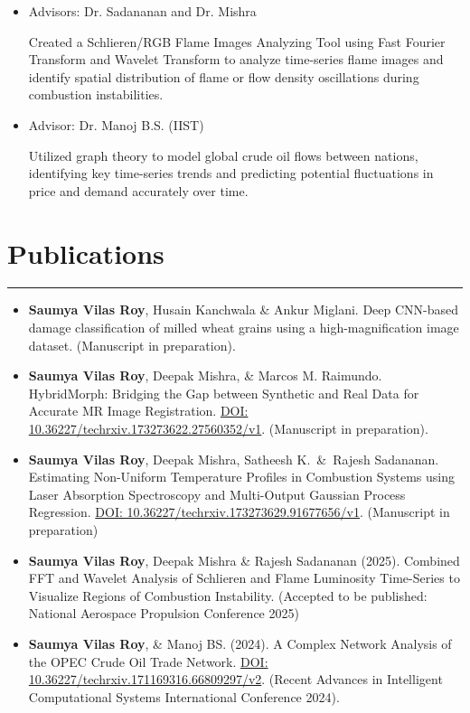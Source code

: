 \documentclass[11pt]{article}
\newlength{\sectionvspace}
\begin{document}
\begin{itemize}[leftmargin=*,noitemsep,topsep=0pt]
\begin{itemize}[leftmargin=*,noitemsep,topsep=0pt]
		
		\item Advisors: Dr. Sadananan and Dr. Mishra
		
Created a Schlieren/RGB Flame Images Analyzing Tool using Fast Fourier Transform and Wavelet Transform to analyze time-series flame images and identify spatial distribution of flame or flow density oscillations during combustion instabilities.
		\item Advisor: Dr. Manoj B.S. (IIST) 
		
Utilized graph theory to model global crude oil flows between nations, identifying key time-series trends and predicting potential fluctuations in price and demand accurately over time.
		
	\end{itemize}
					\end{itemize}
	
		\section*{\bf Publications}
	\vspace{\sectionvspace}
	\rule{\textwidth}{0.4pt}
	\begin{itemize}[leftmargin=*,noitemsep,topsep=0pt]
		
		
		\item \textbf{Saumya Vilas Roy}, Husain Kanchwala \& Ankur Miglani. Deep CNN-based damage classification of milled wheat grains using a high-magnification image dataset. (Manuscript in preparation).

		
\item \textbf{Saumya Vilas Roy}, Deepak Mishra, \& Marcos M. Raimundo. HybridMorph: Bridging the Gap between Synthetic and Real Data for Accurate MR Image Registration. \href{https://doi.org/10.36227/techrxiv.173273622.27560352/v1}{DOI: 10.36227/techrxiv.173273622.27560352/v1}. (Manuscript in preparation).
		
		\item \textbf{Saumya Vilas Roy}, Deepak Mishra, Satheesh K.~\&~Rajesh Sadananan. Estimating Non-Uniform Temperature Profiles in Combustion Systems using Laser Absorption Spectroscopy and Multi-Output Gaussian Process Regression. \href{https://doi.org/10.36227/techrxiv.173273629.91677656/v1}{DOI: 10.36227/techrxiv.173273629.91677656/v1}. (Manuscript in preparation)
		
		\item \textbf{Saumya Vilas Roy}, Deepak Mishra \& Rajesh Sadananan (2025). Combined FFT and Wavelet Analysis of Schlieren and Flame Luminosity Time-Series to Visualize Regions of Combustion Instability. (Accepted to be published: National Aerospace Propulsion Conference 2025)
		
		\item \textbf{Saumya Vilas Roy}, \& Manoj BS. (2024). A Complex Network Analysis of the OPEC Crude Oil Trade Network. \href{https://doi.org/10.36227/techrxiv.171169316.66809297/v2}{DOI: 10.36227/techrxiv.171169316.66809297/v2}. (Recent Advances in Intelligent Computational Systems International Conference 2024).
		
	\end{itemize}
	
\end{document}
